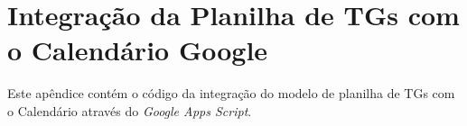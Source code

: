 
\chapter{Integração da Planilha de TGs com o Calendário Google}
Este apêndice contém o código da integração do modelo de planilha de TGs com o Calendário através do \emph{Google Apps Script}.


\lstset{language=Java,
             basicstyle=\footnotesize,
             numbers=left,
             extendedchars=\true
             showspaces = false,
             numberstyle=\footnotesize,
             frame=shadowbox,
             breaklines = true}

